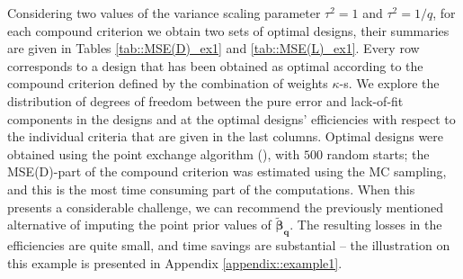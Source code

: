 Considering two values of the variance scaling parameter $\tau^2=1$ and $\tau^2=1/q$, for each compound criterion we obtain two sets of optimal designs, their summaries are given in Tables \ref{tab::MSE(D)_ex1} and \ref{tab::MSE(L)_ex1}. 
Every row corresponds to a design that has been obtained as optimal according to the compound criterion defined by the combination of weights $\kappa$-s. We explore the distribution of degrees of freedom between the pure error and lack-of-fit components in the designs and at the optimal designs' efficiencies with respect to the individual criteria that are given in the last columns. 
Optimal designs were obtained using the point exchange algorithm (\cite{Fedorov1972theory}), with $500$ random starts; the MSE(D)-part of the compound criterion was estimated using the MC sampling, and this is the most time consuming part of the computations. When this presents a considerable challenge, we can recommend the previously mentioned alternative of imputing the point prior values of $\bm{\tilde{\beta}_{q}}$. The resulting losses in the efficiencies are quite small, and time savings are substantial -- the illustration on this example is presented in Appendix \ref{appendix::example1}.

